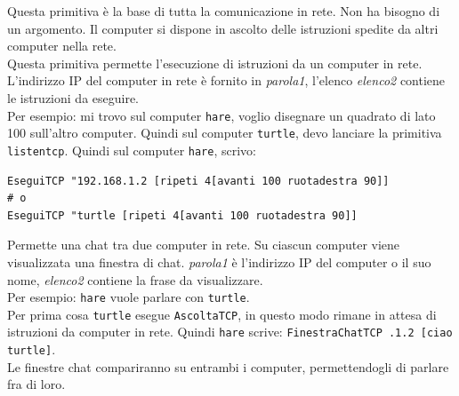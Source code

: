 Questa primitiva è la base di tutta la comunicazione in rete. Non ha bisogno di un argomento. Il computer si dispone in ascolto delle istruzioni spedite da altri computer nella rete. \\

Questa primitiva permette l'esecuzione di istruzioni da un computer in rete. L'indirizzo IP del computer in rete è fornito in \textit{parola1}, l'elenco \textit{elenco2} contiene le istruzioni da eseguire.\\
Per esempio: mi trovo sul computer \texttt{hare}, voglio disegnare un quadrato di lato 100 sull'altro computer. Quindi sul computer \texttt{turtle}, devo lanciare la primitiva \texttt{listentcp}. Quindi sul computer \texttt{hare}, scrivo:\\
\begin{lstlisting}[caption="Disegno su un computer in rete"]
EseguiTCP "192.168.1.2 [ripeti 4[avanti 100 ruotadestra 90]]
# o 
EseguiTCP "turtle [ripeti 4[avanti 100 ruotadestra 90]]
\end{lstlisting} 

Permette una chat tra due computer in rete. Su ciascun computer viene visualizzata una finestra di chat. \textit{parola1} è l'indirizzo IP del computer o il suo nome, \textit{elenco2} contiene la frase da visualizzare.\\
Per esempio: \texttt{hare} vuole parlare con \texttt{turtle}.\\
Per prima cosa \texttt{turtle} esegue \texttt{AscoltaTCP}, in questo modo rimane in attesa di istruzioni da computer in rete. Quindi \texttt{hare} scrive: \texttt{FinestraChatTCP~.1.2~[ciao turtle]}.\\
Le finestre chat compariranno su entrambi i computer, permettendogli di parlare fra di loro.\\ 

